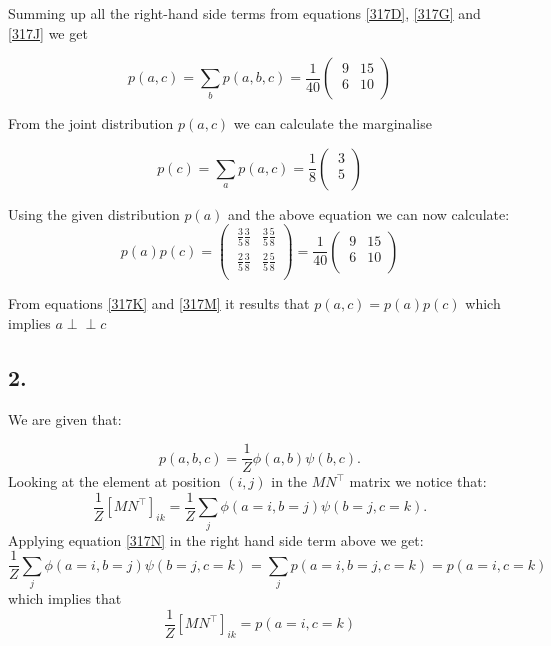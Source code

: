 \documentclass[11pt,a4paper,oneside]{report}
\newcommand\ci{\perp\!\!\!\perp} %
\begin{document}
Summing up all the right-hand side terms from equations \eqref{317D},  
\eqref{317G} and  \eqref{317J} we get

\begin{equation}
\label{317K}
p(a, c) =  \sum_{b} p(a,b,c) = \frac{1}{40}
  \begin{pmatrix}
   \ 9 & 15 \\[0.4em]
   \ 6 & 10 \\
 \end{pmatrix} 
\end{equation}
 
From the joint distribution $p(a,c)$ we can calculate the marginalise

\begin{equation}
\label{317L}
p(c) =  \sum_{a} p(a,c) = \frac{1}{8}
  \begin{pmatrix}
   \ 3 \\[0.4em]
   \ 5 \\
 \end{pmatrix} 
\end{equation}
 
Using the given distribution $p(a)$ and the above equation we can now calculate:
\begin{equation}
\label{317M}
p(a)p(c) =
  \begin{pmatrix}
   \ \frac{3}{5} \frac{3}{8} & \frac{3}{5} \frac{5}{8} \\[0.4em]
   \ \frac{2}{5} \frac{3}{8} & \frac{2}{5} \frac{5}{8} \\
 \end{pmatrix} = \frac{1}{40}
  \begin{pmatrix}
   \ 9 & 15 \\[0.4em]
   \ 6 & 10 \\
 \end{pmatrix} 
\end{equation}

From equations \eqref{317K} and \eqref{317M} it results that $p(a,c) = p(a)p(c)$ 
which implies $a \ci c$

\subsection*{2.}

We are given that:

\begin{equation}
\label{317N}
p(a,b,c) = \frac{1}{Z}\phi(a, b)\psi(b,c). 
\end{equation}
Looking at the element at position $(i,j)$ in the $MN^\top$ matrix we notice 
that:
\begin{equation}
\frac{1}{Z}\left[ MN^\top \right]_{ik} = \frac{1}{Z}\sum_{j}\phi(a=i, 
b=j)\psi(b=j, c=k). 
\end{equation}
Applying equation \eqref{317N} in the right hand side term above we get:
\begin{equation}
\frac{1}{Z}\sum_{j}\phi(a=i, b=j)\psi(b=j, c=k) = \sum_{j}p(a = i, b = j, c = k) 
= p(a = i, c = k) 
\end{equation}
which implies that
\begin{equation}
\frac{1}{Z}\left[ MN^\top \right]_{ik} = p(a = i, c = k) 
\end{equation}
\end{document}
